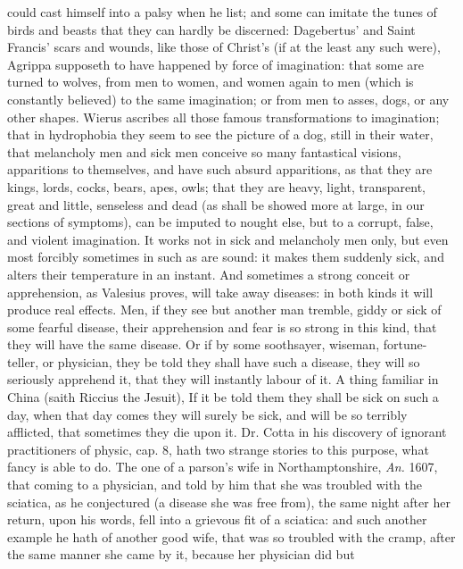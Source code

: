 {could cast himself into a palsy when he list; and some can imitate the
tunes of birds and beasts that they can hardly be discerned:
Dagebertus' and Saint Francis' scars and wounds, like those of Christ's
(if at the least any such were), Agrippa supposeth to have
happened by force of imagination: that some are turned to wolves, from
men to women, and women again to men (which is constantly believed) to
the same imagination; or from men to asses, dogs, or any other shapes.
Wierus ascribes all those famous transformations to imagination;
that in hydrophobia they seem to see the picture of a dog, still in
their water, that melancholy men and sick men conceive so many
fantastical visions, apparitions to themselves, and have such absurd
apparitions, as that they are kings, lords, cocks, bears, apes, owls;
that they are heavy, light, transparent, great and little, senseless
and dead (as shall be showed more at large, in our  sections of
symptoms), can be imputed to nought else, but to a corrupt, false, and
violent imagination. It works not in sick and melancholy men only, but
even most forcibly sometimes in such as are sound: it makes them
suddenly sick, and alters their temperature in an instant. And
sometimes a strong conceit or apprehension, as Valesius proves,
will take away diseases: in both kinds it will produce real effects.
Men, if they see but another man tremble, giddy or sick of some fearful
disease, their apprehension and fear is so strong in this kind, that
they will have the same disease. Or if by some soothsayer, wiseman,
fortune-teller, or physician, they be told they shall have such a
disease, they will so seriously apprehend it, that they will instantly
labour of it. A thing familiar in China (saith Riccius the Jesuit),
If it be told them they shall be sick on such a day, when that
day comes they will surely be sick, and will be so terribly afflicted,
that sometimes they die upon it. Dr. Cotta in his discovery of ignorant
practitioners of physic, cap. 8, hath two strange stories to this
purpose, what fancy is able to do. The one of a parson's wife in
Northamptonshire, \emph{An.} 1607, that coming to a physician, and told by
him that she was troubled with the sciatica, as he conjectured (a
disease she was free from), the same night after her return, upon his
words, fell into a grievous fit of a sciatica: and such another example
he hath of another good wife, that was so troubled with the cramp,
after the same manner she came by it, because her physician did but
}
